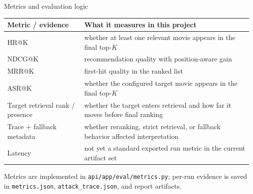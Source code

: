 \documentclass[aspectratio=169,11pt]{beamer}
\begin{document}
\begin{frame}{Metrics and evaluation logic}
\small
\begin{tabularx}{\textwidth}{>{\raggedright\arraybackslash}p{} >{\raggedright\arraybackslash}X}
\toprule
Metric / evidence & What it measures in this project \\
\midrule
HR@K & whether at least one relevant movie appears in the final top-$K$ \\
NDCG@K & recommendation quality with position-aware gain \\
MRR@K & first-hit quality in the ranked list \\
ASR@K & whether the configured target movie appears in the final top-$K$ \\
Target retrieval rank / presence & whether the target enters retrieval and how far it moves before final ranking \\
Trace + fallback metadata & whether reranking, strict retrieval, or fallback behavior affected interpretation \\
Latency & not yet a standard exported run metric in the current artifact set \\
\bottomrule
\end{tabularx}
\vspace{0.4em}

{\footnotesize Metrics are implemented in \texttt{api/app/eval/metrics.py}; per-run evidence is saved in \texttt{metrics.json}, \texttt{attack\_trace.json}, and report artifacts.}
\end{frame}
\end{document}
